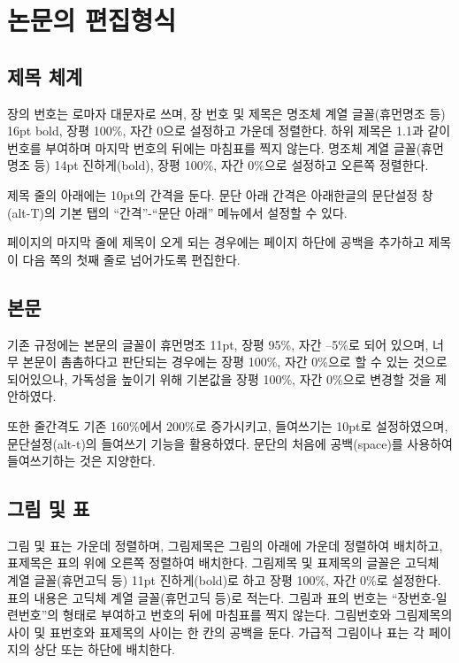 \section{논문의 편집형식}

\subsection{제목 체계}

장의 번호는 로마자 대문자로 쓰며, 장 번호 및 제목은 명조체 계열 글꼴(휴먼명조 등) 16pt bold, 장평 100\%, 자간 0으로 설정하고 가운데 정렬한다. 하위 제목은 1.1과 같이 번호를 부여하며 마지막 번호의 뒤에는 마침표를 찍지 않는다. 명조체 계열 글꼴(휴먼명조 등) 14pt 진하게(bold), 장평 100\%, 자간 0\%으로 설정하고 오른쪽 정렬한다.

제목 줄의 아래에는 10pt의 간격을 둔다. 문단 아래 간격은 아래한글의 문단설정 창(alt-T)의 기본 탭의 “간격”-“문단 아래” 메뉴에서 설정할 수 있다.

페이지의 마지막 줄에 제목이 오게 되는 경우에는 페이지 하단에 공백을 추가하고 제목이 다음 쪽의 첫째 줄로 넘어가도록 편집한다.


\subsection{본문}

기존 규정에는 본문의 글꼴이 휴먼명조 11pt, 장평 95\%, 자간 –5\%로 되어 있으며, 너무 본문이 촘촘하다고 판단되는 경우에는 장평 100\%, 자간 0\%으로 할 수 있는 것으로 되어있으나, 가독성을 높이기 위해 기본값을 장평 100\%, 자간 0\%으로 변경할 것을 제안하였다.

또한 줄간격도 기존 160\%에서 200\%로 증가시키고, 들여쓰기는 10pt로 설정하였으며, 문단설정(alt-t)의 들여쓰기 기능을 활용하였다. 문단의 처음에 공백(space)를 사용하여 들여쓰기하는 것은 지양한다.

\subsection{그림 및 표}

그림 및 표는 가운데 정렬하며, 그림제목은 그림의 아래에 가운데 정렬하여 배치하고, 표제목은 표의 위에 오른쪽 정렬하여 배치한다. 그림제목 및 표제목의 글꼴은 고딕체 계열 글꼴(휴먼고딕 등) 11pt 진하게(bold)로 하고 장평 100\%, 자간 0\%로 설정한다. 표의 내용은 고딕체 계열 글꼴(휴먼고딕 등)로 적는다. 그림과 표의 번호는 “장번호-일련번호”의 형태로 부여하고 번호의 뒤에 마침표를 찍지 않는다. 그림번호와 그림제목의 사이 및 표번호와 표제목의 사이는 한 칸의 공백을 둔다. 가급적 그림이나 표는 각 페이지의 상단 또는 하단에 배치한다.


